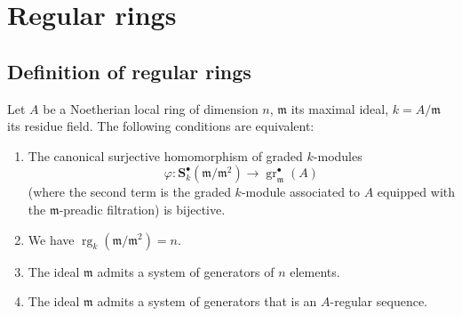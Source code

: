 \section{Regular rings}
\label{section:0.17}

\subsection{Definition of regular rings}
\label{subsection:0.17.1}

\begin{proposition}[17.1.1]
\label{0.17.1.1}
Let $A$ be a Noetherian local ring of dimension $n$, $\mathfrak{m}$ its maximal ideal, $k=A/\mathfrak{m}$ its residue field.
The following conditions are equivalent:
\begin{enumerate}
  \item[{\rm a)}] The canonical surjective homomorphism of graded $k$-modules 
  \[
    \varphi:\mathbf{S}^\bullet_k(\mathfrak{m}/\mathfrak{m}^2)\to\operatorname{gr}^\bullet_\mathfrak{m}(A)
  \]
  (where the second term is the graded $k$-module associated to $A$ equipped with the $\mathfrak{m}$-preadic filtration) is bijective.
  \item[{\rm b)}] We have $\operatorname{rg}_k(\mathfrak{m}/\mathfrak{m}^2)=n$.
  \item[{\rm c)}] The ideal $\mathfrak{m}$ admits a system of generators of $n$ elements.
  \item[{\rm d)}] The ideal $\mathfrak{m}$ admits a system of generators that is an $A$-regular sequence.
\end{enumerate}
\end{proposition}

